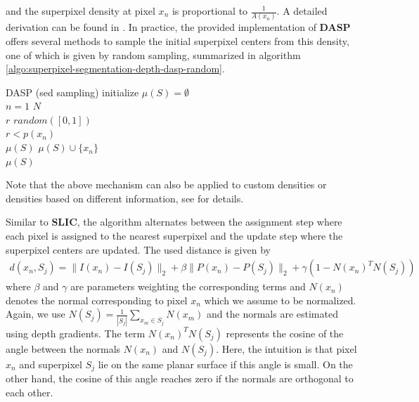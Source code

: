 and the superpixel density at pixel $x_n$ is proportional to $\frac{1}{A(x_n)}$. A detailed derivation can be found in \cite{Weikersdorfer:2014}. In practice, the provided implementation of \textbf{DASP} offers several methods to sample the initial superpixel centers from this density, one of which is given by random sampling, summarized in algorithm \ref{algo:superpixel-segmentation-depth-dasp-random}.
\begin{algorithm}[t!]
	\begin{algo}{DASP (sed sampling)}{\label{algo:superpixel-segmentation-depth-dasp-random}}
		initialize $\mu(S) = \emptyset$\\
		\qfor $n = 1$ \qto $N$\\
			$r$ \qlet $random([0, 1])$\\
			\qif $r < p(x_n)$\\
				\qthen $\mu(S)$ \qlet  $\mu(S) \cup \{x_n\}$\qfi\qrof\\
		\qreturn $\mu(S)$
	\end{algo}
	\caption[\textbf{DASP} \cite{WeikersdorferGossowBeetz:2012} randomly samples the initial superpixel centers from a custom density based on depth information.]{The easiest way to sample superpixel centers form the superpixel density $p(x_n)$ is given by random sampling. For each pixel, a number in the range $[0,1]$ is randomly chosen and compared to the probability $p(x_n)$ of $x_n$ being an initial superpixel center. For details how the desired number of superpixels is met we refer to the implementation\footnote{Available at \url{https://github.com/Danvil/dasp}.}.}
	\label{fig:superpixel-segmentation-depth-dasp-random}
\end{algorithm}
Note that the above mechanism can also be applied to custom densities or densities based on different information, see \cite{Weikersdorfer:2014} for details.

Similar to \textbf{SLIC}, the algorithm alternates between the assignment step where each pixel is assigned to the nearest superpixel and the update step where the superpixel centers are updated. The used distance is given by
\begin{align}
	\label{eq:superpixel-segmentation-depth-dasp-distance}
	d(x_n, S_j) = \|I(x_n) - I(S_j)\|_2 + \beta\|P(x_n) - P(S_j)\|_2 + \gamma \left(1 - N(x_n)^T N(S_j)\right)
\end{align}
where $\beta$ and $\gamma$ are parameters weighting the corresponding terms and $N(x_n)$ denotes the normal corresponding to pixel $x_n$ which we assume to be normalized. Again, we use $N(S_j) = \frac{1}{|S_j|} \sum_{x_m \in S_j} N(x_m)$ and the normals are estimated using depth gradients. The term $N(x_n)^T N(S_j)$ represents the cosine of the angle between the normals $N(x_n)$ and $N(S_j)$. Here, the intuition is that pixel $x_n$ and superpixel $S_j$ lie on the same planar surface if this angle is small. On the other hand, the cosine of this angle reaches zero if the normals are orthogonal to each other.

